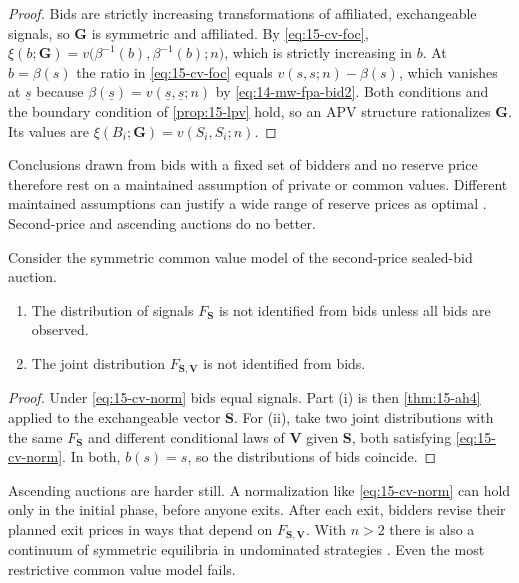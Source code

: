 \begin{proof}
Bids are strictly increasing transformations of affiliated, exchangeable signals, so $\bm G$ is symmetric and
affiliated. By \eqref{eq:15-cv-foc}, $\xi(b;\bm G)=v\bigl(\beta^{-1}(b),\beta^{-1}(b);n\bigr)$, which is
strictly increasing in $b$. At $b=\beta(s)$ the ratio in \eqref{eq:15-cv-foc} equals $v(s,s;n)-\beta(s)$, which vanishes at
$\underline s$ because $\beta(\underline s)=v(\underline s,\underline s;n)$ by \eqref{eq:14-mw-fpa-bid2}. Both
conditions and the boundary condition of \cref{prop:15-lpv} hold, so an APV structure rationalizes
$\bm G$. Its values are $\xi(B_i;\bm G)=v(S_i,S_i;n)$.
\end{proof}

Conclusions drawn from bids with a fixed set of bidders and no reserve price therefore rest on a maintained
assumption of private or common values. Different maintained assumptions can justify a wide range of reserve
prices as optimal \citep[Section~7.1]{AtheyHaile2007}. Second-price and ascending auctions do no better.

\begin{proposition}\label{prop:15-cv-nonid}
Consider the symmetric common value model of the second-price sealed-bid auction.
\begin{enumerate}[label=(\roman*)]
  \item The distribution of signals $F_{\bm S}$ is not identified from bids unless all bids are observed.
  \item The joint distribution $F_{\bm S,\bm V}$ is not identified from bids.
\end{enumerate}
\end{proposition}

\begin{proof}
Under \eqref{eq:15-cv-norm} bids equal signals. Part (i) is then \cref{thm:15-ah4} applied to the exchangeable
vector $\bm S$. For (ii), take two joint distributions with the same $F_{\bm S}$ and different conditional
laws of $\bm V$ given $\bm S$, both satisfying \eqref{eq:15-cv-norm}. In both, $b(s)=s$, so the
distributions of bids coincide.
\end{proof}

Ascending auctions are harder still. A normalization like \eqref{eq:15-cv-norm} can hold only in the initial
phase, before anyone exits. After each exit, bidders revise their planned exit prices in ways that depend on
$F_{\bm S,\bm V}$. With $n>2$ there is also a continuum of symmetric equilibria in undominated strategies
\citep{BikhchandaniHaileRiley2002}. Even the most restrictive common value model fails.

